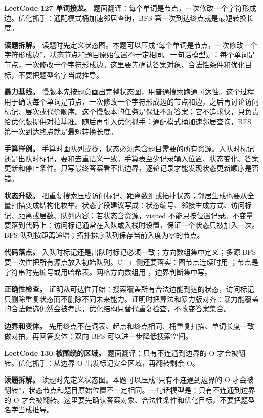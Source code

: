 \noindent\textbf{LeetCode 127 单词接龙。} 题面翻译：每个单词是节点，一次修改一个字符形成边。优化抓手：通配模式桶加速邻居查询，BFS 第一次到达终点就是最短转换长度。

\textbf{读题拆解。} 读题时先定义状态图。本题可以压成“每个单词是节点，一次修改一个字符形成边”，状态节点和题目原始位置不一定相同。一句话模型是：每个单词是节点，一次修改一个字符形成边。这里要先确认答案对象、合法性条件和优化目标，不要把题型名字当成推导。

\textbf{暴力基线。} 慢版本先按题意画出完整状态图，用普通搜索跑通可达性。这个过程用于确认每个单词是节点，一次修改一个字符形成边的节点和边，之后再讨论访问标记、层次或代价顺序。这个慢版本的任务是保证不漏答案；它不追求快，只负责给优化版提供对拍基准。随后再引入优化抓手：通配模式桶加速邻居查询，BFS 第一次到达终点就是最短转换长度。

\textbf{手算样例。} 手算时画队列或栈，状态必须包含题目需要的所有资源。入队时标记还是出队时标记，要和去重语义一致。手算表至少记录输入位置、状态变化、答案更新和停止条件。只写最终答案看不出边界，逐轮记录才能发现状态更新顺序是否错。

\textbf{状态升级。} 把重复搜索压成访问标记、距离数组或拓扑状态；邻居生成也要从全量扫描变成结构化枚举。状态字段建议写成：状态编号、邻接生成方式、访问标记、距离或层数、队列内容；若状态含资源，visited 不能只按位置记录。不变量要落到代码上：访问标记通常在入队或入栈时设置，保证一个状态只被加入一次。BFS 队列按距离递增；拓扑排序队列保存当前入度为零的节点。

\textbf{代码落点。} 入队时标记还是出队时标记必须一致；方向数组集中定义；多源 BFS 要一次性把所有源点放入初始队列。C++ 侧还要落实：图节点连续时用 ；节点是字符串时先编号或用哈希表。网格方向数组用 ，边界判断集中写。

\textbf{正确性检查。} 证明从可达性开始：搜索覆盖所有合法边能到达的状态，访问标记只删除重复状态而不删除不同未来能力。证明时把算法和暴力版对齐：暴力能覆盖的合法候选仍然会被考虑，优化结构只替代重复检查，不改变答案集合。

\textbf{边界和变体。} 先用终点不在词表、起点和终点相同、桶重复扫描、单词长度一致做对拍，再回答变体：双向 BFS 可以进一步降低搜索空间。

\noindent\textbf{LeetCode 130 被围绕的区域。} 题面翻译：只有不连通到边界的 O 才会被翻转。优化抓手：从边界 O 出发标记安全区域，再翻转剩余 O。

\textbf{读题拆解。} 读题时先定义状态图。本题可以压成“只有不连通到边界的 O 才会被翻转”，状态节点和题目原始位置不一定相同。一句话模型是：只有不连通到边界的 O 才会被翻转。这里要先确认答案对象、合法性条件和优化目标，不要把题型名字当成推导。

